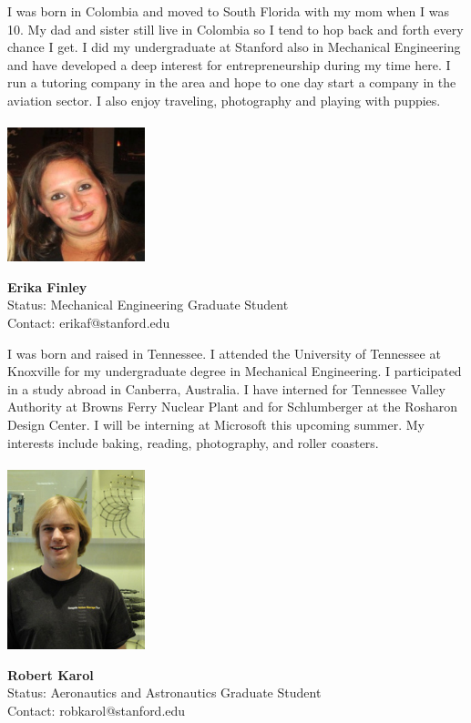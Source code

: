 I was born in Colombia and moved to South Florida with my mom when I was 10. My dad and sister still live in Colombia so I tend to hop back and forth every chance I get. I did my undergraduate at Stanford also in Mechanical Engineering and have developed a deep interest for entrepreneurship during my time here. I run a tutoring company in the area and hope to one day start a company in the aviation sector. I also enjoy traveling, photography and playing with puppies.
\\ \\

\noindent \includegraphics[width=40mm]{images/image012.jpg}
\parbox[b]{0.6\textwidth}{\textbf{Erika Finley}\\
Status: Mechanical Engineering Graduate Student\\
Contact: erikaf@stanford.edu\\
}

I was born and raised in Tennessee. I attended the University of Tennessee at Knoxville for my undergraduate degree in Mechanical Engineering.  I participated in a study abroad in Canberra, Australia.  I have interned for Tennessee Valley Authority at Browns Ferry Nuclear Plant and for Schlumberger at the Rosharon Design Center. I will be interning at Microsoft this upcoming summer. My interests include baking, reading, photography, and roller coasters.  
\\ \\

\noindent \includegraphics[width=40mm]{images/robert_karol.jpg}
\parbox[b]{0.6\textwidth}{\textbf{Robert Karol}\\
Status: Aeronautics and Astronautics Graduate Student\\
Contact: robkarol@stanford.edu \\
}

